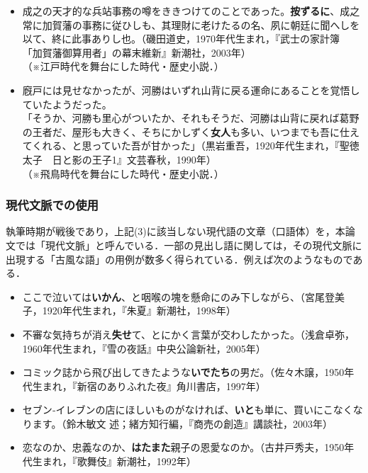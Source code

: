 \documentclass[japanese]{jnlp_1.4}
\begin{document}
\begin{itemize}
\item
成之の天才的な兵站事務の噂をききつけてのことであった。\textbf{按ずるに}、成之常に加賀藩の事務に従ひしも、其理財に老けたるの名、夙に朝廷に聞へしを以て、終に此事ありし也。（磯田道史，1970年代生まれ，『武士の家計簿　「加賀藩御算用者」の幕末維新』新潮社，2003年）\\
（※江戸時代を舞台にした時代・歴史小説．）

\item
廐戸には見せなかったが、河勝はいずれ山背に戻る運命にあることを覚悟していたようだった。\\
「そうか、河勝も里心がついたか、それもそうだ、河勝は山背に戻れば葛野の王者だ、屋形も大きく、そちにかしずく\textbf{女人}も多い、いつまでも吾に仕えてくれる、と思っていた吾が甘かった」（黒岩重吾，1920年代生まれ，『聖徳太子　日と影の王子1』文芸春秋，1990年）\\
（※飛鳥時代を舞台にした時代・歴史小説．）
\end{itemize}


\subsubsection{現代文脈での使用}

執筆時期が戦後であり，上記(3)に該当しない現代語の文章（口語体）を，本論文では「現代文脈」と呼んでいる．一部の見出し語に関しては，その現代文脈に出現する「古風な語」の用例が数多く得られている．例えば次のようなものである．

\begin{itemize}
\item
ここで泣いては\textbf{いかん}、と咽喉の塊を懸命にのみ下しながら、（宮尾登美子，1920年代生まれ，『朱夏』新潮社，1998年）

\item
不審な気持ちが消え\textbf{失せ}て、とにかく言葉が交わしたかった。（浅倉卓弥，1960年代生まれ，『雪の夜話』中央公論新社，2005年）

\item
コミック誌から飛び出してきたような\textbf{いでたち}の男だ。（佐々木譲，1950年代生まれ，『新宿のありふれた夜』角川書店，1997年）

\item
セブン‐イレブンの店にほしいものがなければ、\textbf{いと}も単に、買いにこなくなります。（鈴木敏文\textbar 
述；緒方知行\textbar 編，『商売の創造』講談社，2003年）

\item
恋なのか、忠義なのか、\textbf{はたまた}親子の恩愛なのか。（古井戸秀夫，1950年代生まれ，『歌舞伎』新潮社，1992年）
\end{itemize}
\end{document}
